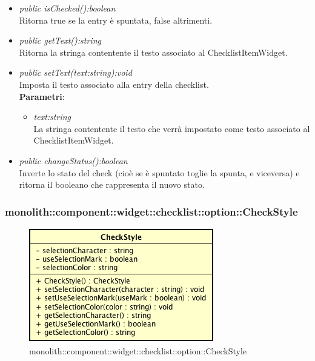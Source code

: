 \begin{itemize}
\begin{itemize}
	\item \textit{public isChecked():boolean}\\
	Ritorna true se la entry è spuntata, false altrimenti.
	\item \textit{public getText():string}\\
	Ritorna la stringa contentente il testo associato al ChecklistItemWidget.
	\item \textit{public setText(text:string):void}\\
	Imposta il testo associato alla entry della checklist.
		\\ \textbf{Parametri}: \begin{itemize}
		\item \textit{text:string}\\
		La stringa contentente il testo che verrà impostato come testo associato al ChecklistItemWidget.
		\end{itemize} 
	\item \textit{public changeStatus():boolean}\\
	Inverte lo stato del check (cioè se è spuntato toglie la spunta, e viceversa) e ritorna il booleano che rappresenta il nuovo stato.
	\end{itemize}
\end{itemize}

\subsubsection{monolith::component::widget::checklist::option::CheckStyle}

\label{monolith::component::widget::checklist::option::CheckStyle}
\begin{figure}[H]
	\centering
	\includegraphics[scale=0.5]{Sezioni/SottosezioniST/img/CheckStyle.png}
	\caption{monolith::component::widget::checklist::option::CheckStyle}
\end{figure}

